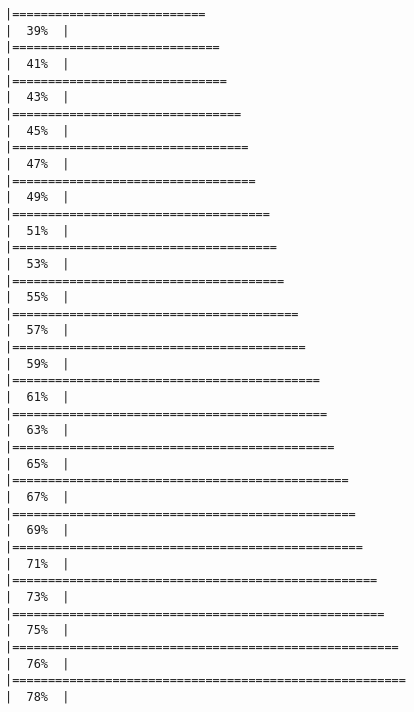 \documentclass[
]{article}
\begin{document}
\begin{verbatim}
|===========================                                           |  39%  |                                                                              |=============================                                         |  41%  |                                                                              |==============================                                        |  43%  |                                                                              |================================                                      |  45%  |                                                                              |=================================                                     |  47%  |                                                                              |==================================                                    |  49%  |                                                                              |====================================                                  |  51%  |                                                                              |=====================================                                 |  53%  |                                                                              |======================================                                |  55%  |                                                                              |========================================                              |  57%  |                                                                              |=========================================                             |  59%  |                                                                              |===========================================                           |  61%  |                                                                              |============================================                          |  63%  |                                                                              |=============================================                         |  65%  |                                                                              |===============================================                       |  67%  |                                                                              |================================================                      |  69%  |                                                                              |=================================================                     |  71%  |                                                                              |===================================================                   |  73%  |                                                                              |====================================================                  |  75%  |                                                                              |======================================================                |  76%  |                                                                              |=======================================================               |  78%  |                                                                              
\end{verbatim}
\end{document}

